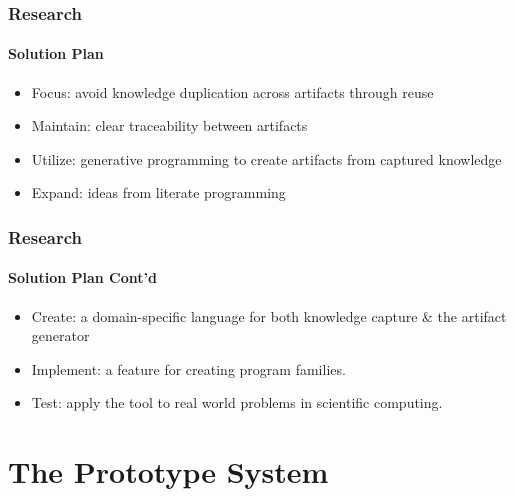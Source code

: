\documentclass{beamer}
\begin{document}


\begin{frame}

\frametitle{Research}
\framesubtitle{Solution Plan}


\begin{itemize}
\item Focus: avoid knowledge duplication across artifacts through reuse%
\item Maintain: clear traceability between artifacts
\item Utilize: generative programming to create artifacts from captured
	knowledge
\item Expand: ideas from literate programming

\end{itemize}
\end{frame}



\begin{frame}

\frametitle{Research}
\framesubtitle{Solution Plan Cont'd}


\begin{itemize}
\item Create: a domain-specific language for both knowledge capture \& the 
	artifact	generator
\item Implement: a feature for creating program families. %
\item Test: apply the tool to real world problems in scientific computing.


\end{itemize}
\end{frame}


\section[Prototype]{The Prototype System}
\end{document}
